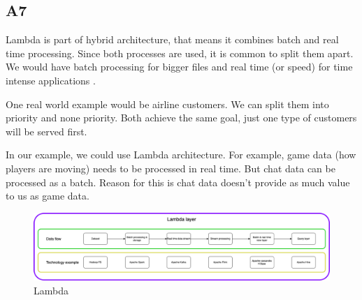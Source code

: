 \subsection{A7}\label{A7}

Lambda is part of hybrid architecture, that means it combines batch and real time processing. Since both processes are used, it is common to split them apart. We would have batch processing for bigger files and real time (or speed) for time intense applications \parencite{lin2017lambda}.

One real world example would be airline customers. We can split them into priority and none priority. Both achieve the same goal, just one type of customers will be served first.

In our example, we could use Lambda architecture. For example, game data (how players are moving) needs to be processed in real time. But chat data can be processed as a batch. Reason for this is chat data doesn't provide as much value to us as game data.

\begin{figure}[H]
\includegraphics[scale=0.25]{img/ProcessingParadigms/BigData-Lambda.png}
\centering
\caption{Lambda}
\label{fig:Lambda}
\end{figure}